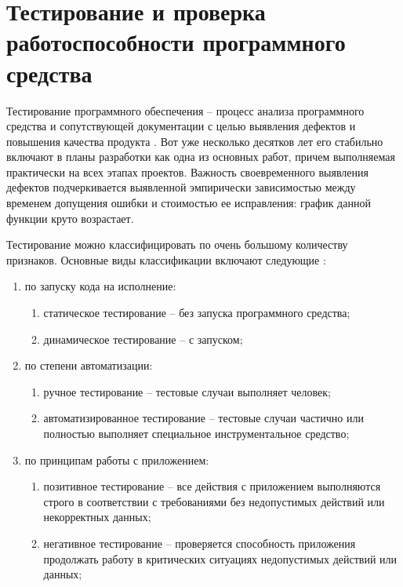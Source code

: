 \section{Тестирование и проверка работоспособности программного средства}
\label{sec:testing}

Тестирование программного обеспечения – процесс анализа программного средства и сопутствующей документации с целью выявления дефектов и
повышения качества продукта \cite{testing_ref}. Вот уже несколько десятков лет его стабильно включают в планы разработки как одна из основных работ, причем
выполняемая практически на всех этапах проектов. Важность своевременного выявления дефектов подчеркивается выявленной эмпирически зависимостью
между временем допущения ошибки и стоимостью ее исправления: график данной функции круто возрастает.

Тестирование можно классифицировать по очень большому количеству
признаков. Основные виды классификации включают следующие \cite{testing_ref}:

\begin{enumerate}
	\item по запуску кода на исполнение:
	\begin{enumerate}
		\item статическое тестирование – без запуска программного средства;
		\item динамическое тестирование – с запуском;
	\end{enumerate}
	\item по степени автоматизации:
	\begin{enumerate}
		\item ручное тестирование – тестовые случаи выполняет человек;
		\item автоматизированное тестирование – тестовые случаи частично или полностью выполняет специальное инструментальное средство;
	\end{enumerate}
    \item по принципам работы с приложением:
	\begin{enumerate}
		\item позитивное тестирование – все действия с приложением выполняются строго в соответствии с требованиями без недопустимых действий или некорректных данных;
		\item негативное тестирование – проверяется способность приложения продолжать работу в критических ситуациях недопустимых действий или данных;
	\end{enumerate}
\end{enumerate}

